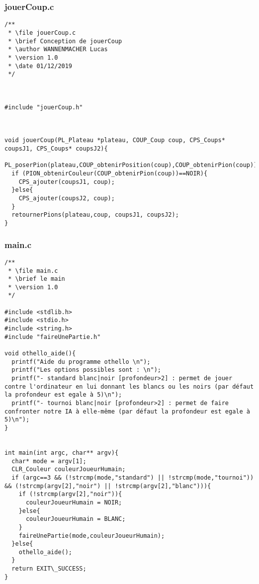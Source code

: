 \subsubsection{jouerCoup.c}
\begin{lstlisting}
/**
 * \file jouerCoup.c
 * \brief Conception de jouerCoup
 * \author WANNENMACHER Lucas
 * \version 1.0
 * \date 01/12/2019
 */



#include "jouerCoup.h"



void jouerCoup(PL_Plateau *plateau, COUP_Coup coup, CPS_Coups* coupsJ1, CPS_Coups* coupsJ2){
  PL_poserPion(plateau,COUP_obtenirPosition(coup),COUP_obtenirPion(coup));
  if (PION_obtenirCouleur(COUP_obtenirPion(coup))==NOIR){
    CPS_ajouter(coupsJ1, coup);
  }else{
    CPS_ajouter(coupsJ2, coup);
  }
  retournerPions(plateau,coup, coupsJ1, coupsJ2);
}
\end{lstlisting}

\subsubsection{main.c}
\begin{lstlisting}
/**
 * \file main.c
 * \brief le main
 * \version 1.0
 */

#include <stdlib.h>
#include <stdio.h>
#include <string.h>
#include "faireUnePartie.h"

void othello_aide(){
  printf("Aide du programme othello \n");
  printf("Les options possibles sont : \n");
  printf("- standard blanc|noir [profondeur>2] : permet de jouer contre l'ordinateur en lui donnant les blancs ou les noirs (par défaut la profondeur est egale à 5)\n");
  printf("- tournoi blanc|noir [profondeur>2] : permet de faire confronter notre IA à elle-même (par défaut la profondeur est egale à 5)\n");
}


int main(int argc, char** argv){
  char* mode = argv[1];
  CLR_Couleur couleurJoueurHumain;
  if (argc==3 && (!strcmp(mode,"standard") || !strcmp(mode,"tournoi")) && (!strcmp(argv[2],"noir") || !strcmp(argv[2],"blanc"))){
    if (!strcmp(argv[2],"noir")){
      couleurJoueurHumain = NOIR;
    }else{
      couleurJoueurHumain = BLANC;
    }
    faireUnePartie(mode,couleurJoueurHumain);
  }else{
    othello_aide();
  }
  return EXIT\_SUCCESS;
}
 
\end{lstlisting}

